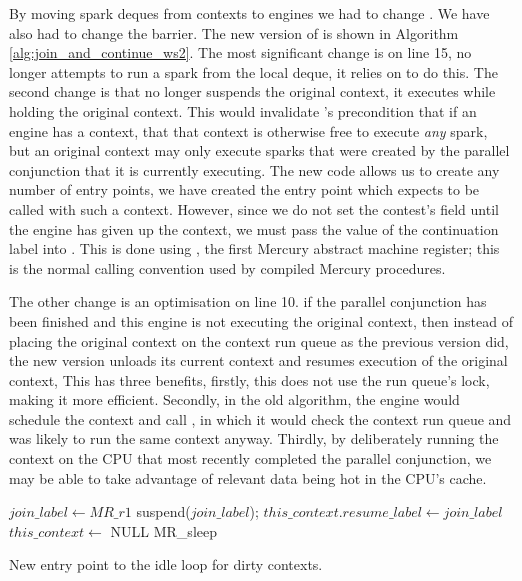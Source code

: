 By moving spark deques from contexts to engines we had to change \idle.
We have also had to change the \joinandcontinue barrier.
The new version of \joinandcontinue is shown in Algorithm
\ref{alg:join_and_continue_ws2}.
The most significant change is on line 15,
\joinandcontinue no longer attempts to run a spark from the local deque,
it relies on \idle to do this.
The second change is that \joinandcontinue no longer suspends the original
context, it executes \idle while holding the original context.
This would invalidate \idle's precondition that if an engine has a context,
that that context is otherwise free to execute \emph{any} spark,
but an original context may only execute sparks that were created by the
parallel conjunction that it is currently executing.
The new \idle code allows us to create any number of entry points,
we have created the \idleorigcontext entry point which expects to be called
with such a context.
However, since we do not set the contest's  field until
the engine has given up the context,
we must pass the value of the continuation label into \idleorigcontext.
This is done using , the first Mercury abstract machine
register;
this is the normal calling convention used by compiled Mercury procedures.

The other change is an optimisation on line 10.
if the parallel conjunction has been finished and this engine is not
executing the original context,
then instead of placing the original context on the context run queue as the
previous version did,
the new version unloads its current context and resumes execution of the
original context,
This has three benefits,
firstly, this does not use the run queue's lock,
making it more efficient.
Secondly, in the old algorithm, the engine would schedule the context and
call \idle,
in which it would check the context run queue and was likely to run the same
context anyway.
Thirdly, by deliberately running the context on the CPU that most
recently completed the parallel conjunction,
we may be able to take advantage of relevant data being hot in the CPU's
cache.

\begin{algorithm}[tbp]
\begin{algorithmic}
        \State $join\_label \gets MR\_r1$
        \State {}
        \State suspend($join\_label$);
        \State $this\_context.resume\_label \gets join\_label$
        \State $this\_context \gets$ NULL
        \State {}
        \State {}
        \State {}
        \Goto MR\_sleep
    \EndProcedure
\end{algorithmic}
\caption{New entry point to the idle loop for dirty contexts.}
\label{alg:idle_orig_context}
\end{algorithm}

